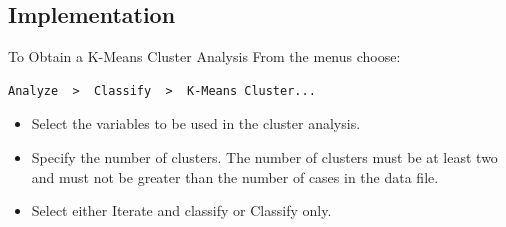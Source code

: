 \documentclass[a4paper,12pt]{article}
\begin{document}
\subsection*{Implementation}
To Obtain a K-Means Cluster Analysis
From the menus choose:
\begin{verbatim}
Analyze  >  Classify  >  K-Means Cluster...    
\end{verbatim}

\begin{itemize}
\item 	Select the variables to be used in the cluster analysis. 
\item 	Specify the number of clusters. The number of clusters must be at least two and must not be greater than the number of cases in the data file.
\item 	Select either Iterate and classify or Classify only.
\end{itemize}
\end{document}
